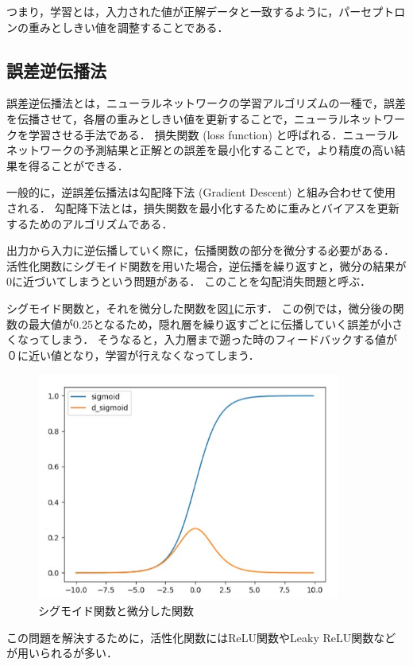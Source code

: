 \documentclass[a4j,12pt,dvipdfmx]{jreport}
\begin{document}
つまり，学習とは，入力された値が正解データと一致するように，パーセプトロンの重みとしきい値を調整することである．

\subsection{誤差逆伝播法}
誤差逆伝播法とは，ニューラルネットワークの学習アルゴリズムの一種で，誤差を伝播させて，各層の重みとしきい値を更新することで，ニューラルネットワークを学習させる手法である．
損失関数 (loss function) と呼ばれる．ニューラルネットワークの予測結果と正解との誤差を最小化することで，より精度の高い結果を得ることができる．

一般的に，逆誤差伝播法は勾配降下法 (Gradient Descent) と組み合わせて使用される．
勾配降下法とは，損失関数を最小化するために重みとバイアスを更新するためのアルゴリズムである．

出力から入力に逆伝播していく際に，伝播関数の部分を微分する必要がある．
活性化関数にシグモイド関数を用いた場合，逆伝播を繰り返すと，微分の結果が0に近づいてしまうという問題がある．
このことを勾配消失問題と呼ぶ．

シグモイド関数と，それを微分した関数を図\ref{fig:sigmoid}に示す．
この例では，微分後の関数の最大値が0.25となるため，隠れ層を繰り返すごとに伝播していく誤差が小さくなってしまう．
そうなると，入力層まで遡った時のフィードバックする値が０に近い値となり，学習が行えなくなってしまう．

\begin{figure}[b]
  \centering
  \includegraphics[width=10cm]{image/sigmoid.jpg}
  \caption{シグモイド関数と微分した関数}
  \label{fig:sigmoid}
\end{figure}

この問題を解決するために，活性化関数にはReLU関数やLeaky ReLU関数などが用いられるが多い．
\end{document}
